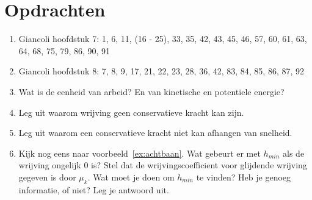 \section{Opdrachten}

\begin{enumerate}
\item Giancoli hoofdstuk 7: 1, 6, 11, (16 - 25), 33, 35, 42, 43, 45, 46, 57, 60, 61, 63, 64, 68, 75, 79, 86, 90, 91 
\item Giancoli hoofdstuk 8: 7, 8, 9, 17, 21, 22, 23, 28, 36, 42, 83, 84, 85, 86, 87, 92 
\item Wat is de eenheid van arbeid? En van kinetische en potentiele energie?
\item Leg uit waarom wrijving geen conservatieve kracht kan zijn.
\item Leg uit waarom een conservatieve kracht niet kan afhangen van snelheid.
\item Kijk nog eens naar voorbeeld~\ref{ex:achtbaan}. Wat gebeurt er met $h_{min}$ als
de wrijving ongelijk 0 is? Stel dat de wrijvingscoefficient voor glijdende wrijving gegeven
is door $\mu_k$. Wat moet je doen om $h_{min}$ te vinden? Heb je genoeg informatie, 
of niet? Leg je antwoord uit.
\end{enumerate}

